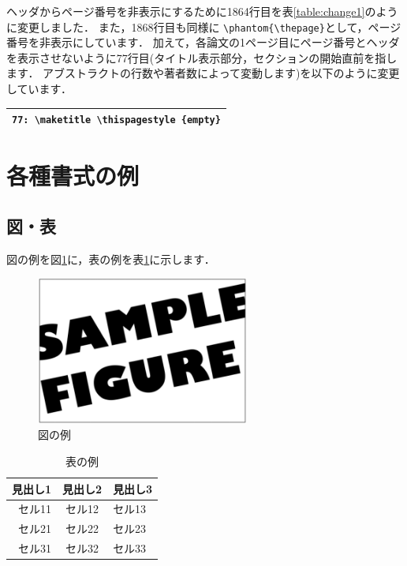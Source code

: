 \documentclass[T,J]{fose} %
\begin{document}
ヘッダからページ番号を非表示にするために1864行目を表\ref{table:change1}のように変更しました．
また，1868行目も同様に \verb|\phantom{\thepage}|として，ページ番号を非表示にしています．
加えて，各論文の1ページ目にページ番号とヘッダを表示させないように77行目(タイトル表示部分，セクションの開始直前を指します．
アブストラクトの行数や著者数によって変動します)を以下のように変更しています．\\

\begin{tabularx}{23zw}{|X|}
	\hline
	\verb|77: \maketitle \thispagestyle {empty}|
	\\
	\hline
\end{tabularx}


\section{各種書式の例}
\subsection{図・表}
図の例を図\ref{fig:figExample}に，表の例を表\ref{table:tableExample}に示します．

\begin{figure}[tb]
	\centering
	\includegraphics[width=7.0cm]{image/sampleFig.png}
	\caption{図の例}
	\label{fig:figExample}
\end{figure}

\begin{table}[tb]
	\centering
	\caption{表の例}
	\label{table:tableExample}
	\begin{tabular}{rcl}
		\hline %
		見出し1 & 見出し2& 見出し3 \\ \hline
		\hline %
		セル11 & セル12 & セル13 \\ \hline
		セル21 & セル22 & セル23 \\ \hline
		セル31 & セル32 & セル33 \\ \hline
		\hline
	\end{tabular}
\end{table}
\end{document}
